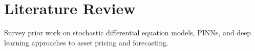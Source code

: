 \chapter{Literature Review}

Survey prior work on stochastic differential equation models, PINNs, and deep learning approaches to asset pricing and forecasting.
